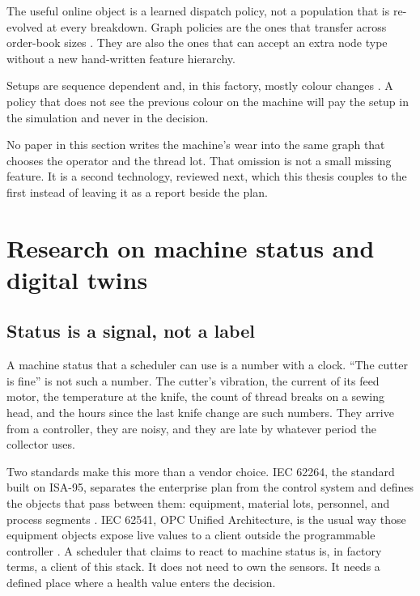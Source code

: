 The useful online object is a learned dispatch policy, not a population that is re-evolved at every breakdown. Graph policies are the ones that transfer across order-book sizes \cite{zhang2020,song2023}. They are also the ones that can accept an extra node type without a new hand-written feature hierarchy.

Setups are sequence dependent and, in this factory, mostly colour changes \cite{allahverdi2015}. A policy that does not see the previous colour on the machine will pay the setup in the simulation and never in the decision.

No paper in this section writes the machine's wear into the same graph that chooses the operator and the thread lot. That omission is not a small missing feature. It is a second technology, reviewed next, which this thesis couples to the first instead of leaving it as a report beside the plan.

\section{Research on machine status and digital twins}
\label{sec:tech2-review}

\subsection{Status is a signal, not a label}

A machine status that a scheduler can use is a number with a clock. ``The cutter is fine'' is not such a number. The cutter's vibration, the current of its feed motor, the temperature at the knife, the count of thread breaks on a sewing head, and the hours since the last knife change are such numbers. They arrive from a controller, they are noisy, and they are late by whatever period the collector uses.

Two standards make this more than a vendor choice. IEC 62264, the standard built on ISA-95, separates the enterprise plan from the control system and defines the objects that pass between them: equipment, material lots, personnel, and process segments \cite{iec62264}. IEC 62541, OPC Unified Architecture, is the usual way those equipment objects expose live values to a client outside the programmable controller \cite{iec62541}. A scheduler that claims to react to machine status is, in factory terms, a client of this stack. It does not need to own the sensors. It needs a defined place where a health value enters the decision.

